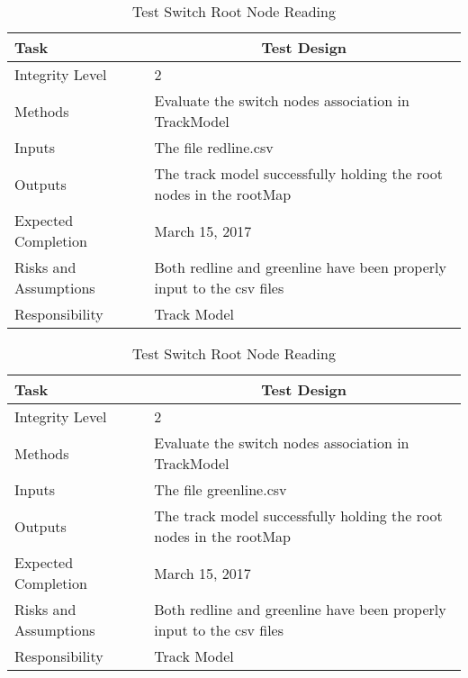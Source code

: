 \documentclass[]{article}
\begin{document}
\begin{table}[H]
	\centering
	\caption{Test Switch Root Node Reading}
	\begin{tabular}{|l|l|}
		\hline
		Task & \multicolumn{1}{c|}{Test Design} \\ \hline
		Integrity Level & 2 \\ \hline
		Methods & \parbox[t]{10cm}{Evaluate the switch nodes association in TrackModel}\\ \hline
		Inputs &  The file redline.csv \\ \hline
		Outputs &  The track model successfully holding the root nodes in the rootMap\\ \hline
		Expected Completion & March 15, 2017\\ \hline
		Risks and Assumptions & Both redline and greenline have been properly input to the csv files \\ \hline
		Responsibility & Track Model\\ \hline
	\end{tabular}
\end{table}

\begin{table}[H]
	\centering
	\caption{Test Switch Root Node Reading}
	\begin{tabular}{|l|l|}
		\hline
		Task & \multicolumn{1}{c|}{Test Design} \\ \hline
		Integrity Level & 2 \\ \hline
		Methods & Evaluate the switch nodes association in TrackModel\\ \hline
		Inputs &  The file greenline.csv \\ \hline
		Outputs &  The track model successfully holding the root nodes in the rootMap\\ \hline
		Expected Completion & March 15, 2017\\ \hline
		Risks and Assumptions & Both redline and greenline have been properly input to the csv files \\ \hline
		Responsibility & Track Model\\ \hline
	\end{tabular}
\end{table}
\end{document}
